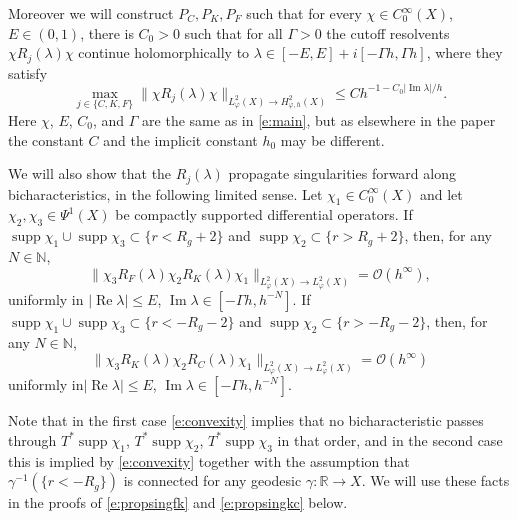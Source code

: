 \documentclass[reqno, 12pt]{amsart}
\newcommand \N {\mathbb{N}}
\newcommand \R {\mathbb{R}}
\newcommand \Oh {\mathcal{O}}
\DeclareMathOperator \re {Re}
\DeclareMathOperator \im {Im}
\DeclareMathOperator \supp {supp}
\theoremstyle{definition}
\numberwithin{equation}{section}
\numberwithin{prop}{section}
\numberwithin{figure}{section}
\begin{document}
Moreover we will construct $P_C, P_K,P_F$ such that  for every $\chi \in C_0^\infty(X)$, $E \in (0,1)$, there is $C_0 > 0$ such that for all $\Gamma > 0$ the cutoff resolvents $\chi R_j(\lambda) \chi$ continue holomorphically to $\lambda \in [-E,E] + i[-\Gamma h,\Gamma h]$, where they satisfy
\begin{equation}\label{e:modelboundj}
\max_{j \in \{C,K,F\}} \|\chi R_j(\lambda) \chi\|_{L^2_\varphi(X) \to H^2_{\varphi,h}(X)} \le C h^{-1 - C_0 |\im \lambda|/h}.
\end{equation}
Here $\chi$, $E$, $C_0$, and $\Gamma$ are the same as in \eqref{e:main}, but as elsewhere in the paper the constant $C$ and the implicit constant $h_0$ may be different.

We will also show  that the  $R_j(\lambda)$  propagate singularities forward along bicharacteristics, in the following limited sense. Let $\chi_1 \in C_0^\infty(X)$ and let $\chi_2,\chi_3 \in \Psi^1(X)$ be compactly supported differential operators. If $\supp \chi_1 \cup \supp \chi_3 \subset \{r < R_g+2\}$ and $\supp \chi_2 \subset \{r>R_g+2\}$, then, for any $N \in \N$,
\begin{equation}\label{e:propsingfk}
\|\chi_3 R_F(\lambda) \chi_2 R_K(\lambda) \chi_1\| _{L^2_\varphi(X) \to L^2_\varphi(X)}= \Oh(h^\infty),
\end{equation}
uniformly in $| \re \lambda| \le E$, $\im \lambda \in [-\Gamma h, h^{-N}]$.
If  $\supp \chi_1 \cup \supp \chi_3 \subset \{r < - R_g-2\}$ and $\supp \chi_2 \subset \{r>-R_g-2\}$, then, for any $N \in \N$,
\begin{equation}\label{e:propsingkc}
\|\chi_3 R_K(\lambda) \chi_2 R_C(\lambda) \chi_1\|_{L^2_\varphi(X) \to L^2_\varphi(X)} = \Oh(h^\infty)
\end{equation}
uniformly in$| \re \lambda| \le E$, $\im \lambda \in [-\Gamma h, h^{-N}]$. %

Note that in the first case \eqref{e:convexity} implies that no bicharacteristic passes through $T^*\supp \chi_1$, $T^*\supp\chi_2$, $T^*\supp\chi_3$ in that order, and in the second case this is implied by \eqref{e:convexity} together with the assumption that $\gamma^{-1}(\{r<-R_g\})$ is connected for any geodesic $\gamma \colon \R \to X$.  We will use these facts in the proofs of \eqref{e:propsingfk} and \eqref{e:propsingkc} below. %
\end{document}

